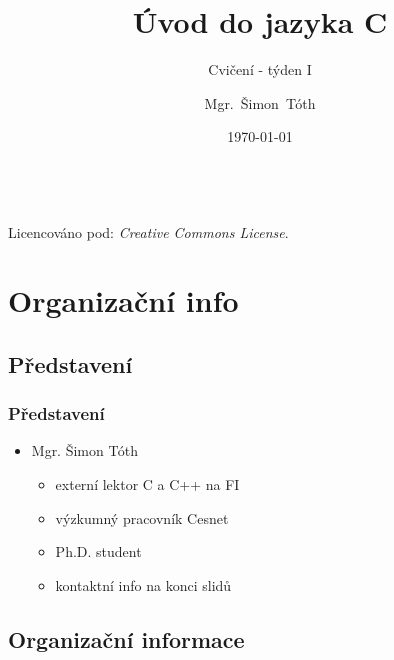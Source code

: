 

\title{Úvod do jazyka C}
\subtitle{Cvičení - týden I}
\author[]{Mgr.~Šimon~Tóth}
\date{\today}

\newcommand{\CcNote}[1]{%
        Licencováno pod: \textit{Creative Commons #1 3.0 License}.%
}


	\begin{frame}
		\titlepage
		\vfill
		\begin{center}
			\\
			{\tiny\CcNote{\CcLongnameByNcSa}}
			\vspace*{2ex}
		\end{center}
	\end{frame}

\section{Organizační info}
\subsection{Představení}
        
\begin{frame}
	\frametitle{Představení}
	\begin{itemize}
		\item{Mgr. Šimon Tóth}
		\begin{itemize}
			\item{externí lektor C a C++ na FI}
			\item{výzkumný pracovník Cesnet}
			\item{Ph.D. student}
			\item{kontaktní info na konci slidů}
		\end{itemize}
	\end{itemize}
\end{frame}

\subsection{Organizační informace}

